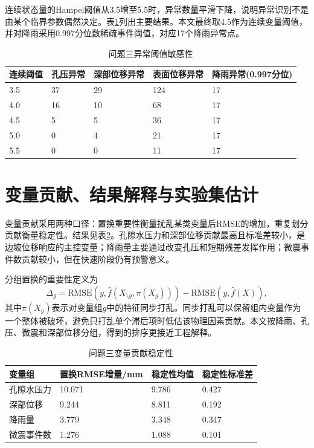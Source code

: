 连续状态量的Hampel阈值从3.5增至5.5时，异常数量平滑下降，说明异常识别不是由某个临界参数偶然决定。表\ref{tab:q3_sensitivity}列出主要结果。本文最终取4.5作为连续变量阈值，并对降雨采用0.997分位数稀疏事件阈值，对应17个降雨异常点。

\begin{table}[htbp]
\centering
\small
\caption{问题三异常阈值敏感性}
\label{tab:q3_sensitivity}
\begin{tabular}{lllll}
\toprule
连续阈值 & 孔压异常 & 深部位移异常 & 表面位移异常 & 降雨异常(0.997分位) \\
\midrule
3.5 & 37 & 29 & 124 & 17 \\
4.0 & 16 & 10 & 68 & 17 \\
4.5 & 5 & 5 & 36 & 17 \\
5.0 & 0 & 4 & 21 & 17 \\
5.5 & 0 & 0 & 11 & 17 \\
\bottomrule
\end{tabular}
\end{table}

\section{变量贡献、结果解释与实验集估计}

变量贡献采用两种口径：置换重要性衡量扰乱某类变量后RMSE的增加，重复划分贡献衡量稳定性。结果见表\ref{tab:q3_contribution}。孔隙水压力和深部位移贡献最高且标准差较小，是边坡位移响应的主控变量；降雨量主要通过改变孔压和短期残差发挥作用；微震事件数贡献较小，但在快速阶段仍有预警意义。

分组置换的重要性定义为
\begin{equation}
  \Delta_g=\mathrm{RMSE}\left(y,\hat f(X_{\setminus g},\pi(X_g))\right)-\mathrm{RMSE}\left(y,\hat f(X)\right),
\end{equation}
其中$\pi(X_g)$表示对变量组$g$中的特征同步打乱。同步打乱可以保留组内变量作为一个整体被破坏，避免只打乱单个滞后项时低估该物理因素贡献。本文按降雨、孔压、微震和深部位移分组，得到的排序更接近工程解释。

\begin{table}[htbp]
\centering
\small
\caption{问题三变量贡献稳定性}
\label{tab:q3_contribution}
\begin{tabular}{llll}
\toprule
变量组 & 置换RMSE增量/mm & 稳定性均值 & 稳定性标准差 \\
\midrule
孔隙水压力 & 10.071 & 9.786 & 0.427 \\
深部位移 & 9.244 & 8.811 & 0.192 \\
降雨量 & 3.779 & 3.348 & 0.347 \\
微震事件数 & 1.276 & 1.088 & 0.101 \\
\bottomrule
\end{tabular}
\end{table}

